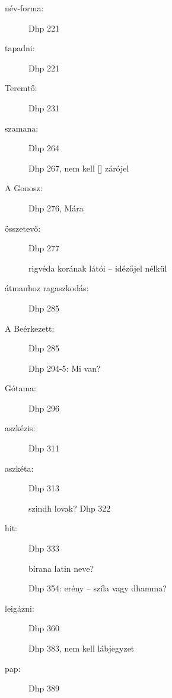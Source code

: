 \begin{description}

\item[név-forma:] Dhp 221

\item[tapadni:] Dhp 221

\item[Teremtő:] Dhp 231



\item[szamana:] Dhp 264

Dhp 267, nem kell [] zárójel


\item[A Gonosz:] Dhp 276, Mára

\item[összetevő:] Dhp 277

rigvéda korának látói -- idézőjel nélkül

\item[átmanhoz ragaszkodás:] Dhp 285

\item[A Beérkezett:] Dhp 285


Dhp 294-5: Mi van?

\item[Gótama:] Dhp 296


\item[aszkézis:] Dhp 311

\item[aszkéta:] Dhp 313


szindh lovak? Dhp 322

\item[hit:] Dhp 333


bírana latin neve?

Dhp 354: erény -- szíla vagy dhamma?


\item[leigázni:] Dhp 360



Dhp 383, nem kell lábjegyzet

\item[pap:] Dhp 389



\end{description}

